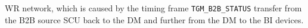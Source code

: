 WR network, which is caused by the timing frame \verb|TGM_B2B_STATUS| transfer from the B2B source SCU back to the DM and further from the DM to the BI devices.


